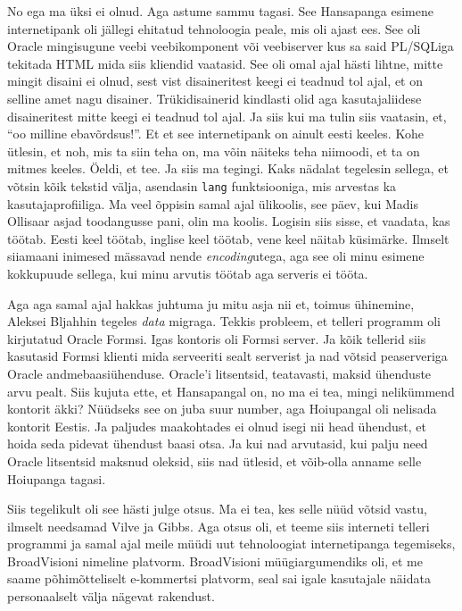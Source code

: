 No ega ma üksi ei olnud. Aga astume sammu tagasi. See Hansapanga esimene 
internetipank oli jällegi ehitatud tehnoloogia peale, mis oli ajast ees. See 
oli Oracle mingisugune veebi veebikomponent või veebiserver kus 
sa said PL/SQLiga tekitada HTML mida siis kliendid 
vaatasid. See oli omal ajal hästi lihtne, mitte mingit disaini ei olnud, sest 
vist disaineritest keegi ei teadnud tol ajal, et on selline amet nagu disainer. 
Trükidisainerid kindlasti olid aga kasutajaliidese disaineritest mitte keegi ei 
teadnud tol ajal. Ja siis kui ma tulin siis vaatasin, et, \enquote{oo milline 
ebavõrdsus!}. Et et see internetipank on ainult eesti keeles. Kohe ütlesin, et 
noh, mis ta siin teha on, ma võin näiteks teha niimoodi, et ta on 
mitmes keeles. Öeldi, et tee. Ja siis ma tegingi. Kaks nädalat tegelesin 
sellega, et võtsin kõik tekstid välja, asendasin \verb|lang| funktsiooniga, mis 
arvestas ka kasutajaprofiiliga. Ma veel õppisin samal ajal ülikoolis, see 
päev, kui Madis Ollisaar asjad toodangusse pani, olin ma koolis. 
Logisin siis sisse, et vaadata, kas töötab. Eesti keel töötab, inglise keel 
töötab, vene keel näitab küsimärke. Ilmselt siiamaani inimesed mässavad nende 
\emph{encoding}utega, aga see oli minu esimene kokkupuude sellega, kui minu 
arvutis töötab aga serveris ei tööta.

Aga aga samal ajal hakkas juhtuma ju mitu asja nii et, toimus ühinemine, 
Aleksei Bljahhin tegeles \emph{data} migraga. 
Tekkis probleem, et telleri programm oli kirjutatud Oracle Formsi. Igas 
kontoris oli Formsi server. Ja kõik tellerid siis kasutasid Formsi klienti mida 
serveeriti sealt serverist ja nad võtsid peaserveriga Oracle 
andmebaasiühenduse. Oracle'i litsentsid, teatavasti, maksid ühenduste arvu 
pealt. Siis kujuta ette, et Hansapangal on, no ma ei tea, mingi nelikümmend 
kontorit äkki? Nüüdseks see on juba suur number, aga Hoiupangal oli nelisada 
kontorit Eestis. Ja paljudes maakohtades ei olnud isegi nii head ühendust, et 
hoida seda pidevat ühendust baasi otsa. Ja kui nad arvutasid, kui palju need 
Oracle litsentsid maksnud oleksid, siis nad ütlesid, et võib-olla anname selle
Hoiupanga tagasi. 

Siis tegelikult oli see hästi julge otsus. Ma ei tea, kes selle nüüd võtsid 
vastu, ilmselt needsamad Vilve ja 
Gibbs. Aga otsus oli, et teeme siis 
interneti telleri programmi ja samal ajal meile müüdi uut tehnoloogiat 
internetipanga tegemiseks, BroadVisioni nimeline platvorm. 
BroadVisioni müügiargumendiks oli, et me saame põhimõtteliselt e-kommertsi 
platvorm,  seal sai igale kasutajale näidata personaalselt välja nägevat 
rakendust.

